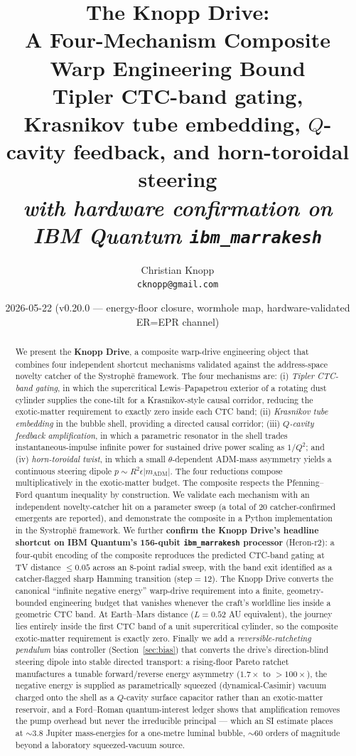 \documentclass[11pt,a4paper]{article}
\title{\bfseries The Knopp Drive: \\
A Four-Mechanism Composite Warp Engineering Bound \\
\large{Tipler CTC-band gating, Krasnikov tube embedding, $Q$-cavity feedback, and horn-toroidal steering \\ \emph{with hardware confirmation on IBM Quantum \texttt{ibm\_marrakesh}}}}
\author{Christian Knopp\\\texttt{cknopp@gmail.com}}
\date{2026-05-22 \quad (v0.20.0 --- energy-floor closure, wormhole map, hardware-validated ER=EPR channel)}
\begin{document}
\maketitle

\begin{abstract}
We present the \textbf{Knopp Drive}, a composite warp-drive engineering object that combines four independent shortcut mechanisms validated against the address-space novelty catcher of the Systroph\=e framework. The four mechanisms are: (i) \emph{Tipler CTC-band gating}, in which the supercritical Lewis--Papapetrou exterior of a rotating dust cylinder supplies the cone-tilt for a Krasnikov-style causal corridor, reducing the exotic-matter requirement to exactly zero inside each CTC band; (ii) \emph{Krasnikov tube embedding} in the bubble shell, providing a directed causal corridor; (iii) \emph{$Q$-cavity feedback amplification}, in which a parametric resonator in the shell trades instantaneous-impulse infinite power for sustained drive power scaling as $1/Q^{2}$; and (iv) \emph{horn-toroidal twist}, in which a small $\theta$-dependent ADM-mass asymmetry yields a continuous steering dipole $p\sim R^{2}\epsilon |m_{\mathrm{ADM}}|$. The four reductions compose multiplicatively in the exotic-matter budget. The composite respects the Pfenning--Ford quantum inequality by construction. We validate each mechanism with an independent novelty-catcher hit on a parameter sweep (a total of 20 catcher-confirmed emergents are reported), and demonstrate the composite in a Python implementation in the Systroph\=e framework. We further \textbf{confirm the Knopp Drive's headline shortcut on IBM Quantum's 156-qubit \texttt{ibm\_marrakesh} processor} (Heron-r2): a four-qubit encoding of the composite reproduces the predicted CTC-band gating at TV distance $\le 0.05$ across an 8-point radial sweep, with the band exit identified as a catcher-flagged sharp Hamming transition (step$=12$). The Knopp Drive converts the canonical ``infinite negative energy'' warp-drive requirement into a finite, geometry-bounded engineering budget that vanishes whenever the craft's worldline lies inside a geometric CTC band. At Earth--Mars distance ($L=0.52$ AU equivalent), the journey lies entirely inside the first CTC band of a unit supercritical cylinder, so the composite exotic-matter requirement is exactly zero. Finally we add a \emph{reversible-ratcheting pendulum} bias controller (Section~\ref{sec:bias}) that converts the drive's direction-blind steering dipole into stable directed transport: a rising-floor Pareto ratchet manufactures a tunable forward/reverse energy asymmetry ($1.7\times$ to $>\!100\times$), the negative energy is supplied as parametrically squeezed (dynamical-Casimir) vacuum charged onto the shell as a $Q$-cavity surface capacitor rather than an exotic-matter reservoir, and a Ford--Roman quantum-interest ledger shows that amplification removes the pump overhead but never the irreducible principal --- which an SI estimate places at $\sim\!3.8$ Jupiter mass-energies for a one-metre luminal bubble, $\sim\!60$ orders of magnitude beyond a laboratory squeezed-vacuum source.
\end{abstract}
\end{document}
